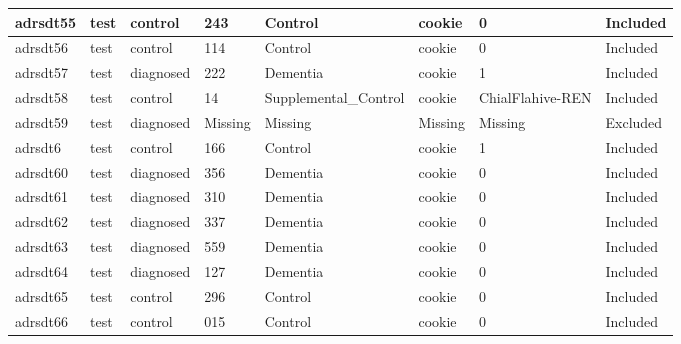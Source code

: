 \begin{center}
\begin{longtable}{|l|l|l|l|l|l|l|l|}
adrsdt55       & test                  & control           & 243                & Control              & cookie          & 0                & Included      \\ \hline
adrsdt56       & test                  & control           & 114                & Control              & cookie          & 0                & Included      \\ \hline
adrsdt57       & test                  & diagnosed         & 222                & Dementia             & cookie          & 1                & Included      \\ \hline
adrsdt58       & test                  & control           & 14                 & Supplemental\_Control & cookie          & ChialFlahive-REN & Included      \\ \hline
adrsdt59       & test                  & diagnosed         & Missing            & Missing              & Missing         & Missing          & Excluded      \\ \hline
adrsdt6        & test                  & control           & 166                & Control              & cookie          & 1                & Included      \\ \hline
adrsdt60       & test                  & diagnosed         & 356                & Dementia             & cookie          & 0                & Included      \\ \hline
adrsdt61       & test                  & diagnosed         & 310                & Dementia             & cookie          & 0                & Included      \\ \hline
adrsdt62       & test                  & diagnosed         & 337                & Dementia             & cookie          & 0                & Included      \\ \hline
adrsdt63       & test                  & diagnosed         & 559                & Dementia             & cookie          & 0                & Included      \\ \hline
adrsdt64       & test                  & diagnosed         & 127                & Dementia             & cookie          & 0                & Included      \\ \hline
adrsdt65       & test                  & control           & 296                & Control              & cookie          & 0                & Included      \\ \hline
adrsdt66       & test                  & control           & 015                & Control              & cookie          & 0                & Included      \\ \hline

\end{longtable}
\end{center}
